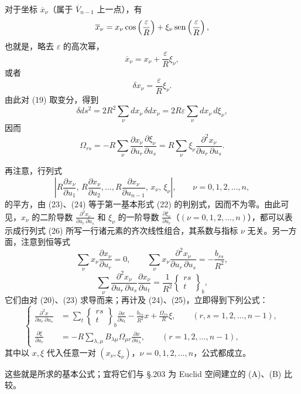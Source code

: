 对于坐标 $\overline{x}_\nu$（属于 $\overline{V}_{n-1}$ 上一点），有
\[
\overline{x}_\nu=x_\nu\cos\left(\frac\varepsilon R\right)+\xi_\nu\operatorname{sen}\left(\frac\varepsilon R\right),
\]
也就是，略去 $\varepsilon$ 的高次幂，
\[
\overline{x}_\nu=x_\nu+\frac{\varepsilon}{R}\xi_\nu,
\]
或者
\[
\delta x_\nu=\frac{\varepsilon}{R}\xi_\nu.
\]
由此对 (19) 取变分，得到
\[
\delta ds^2=2R^2\sum_\nu d x_\nu\,\delta d x_\nu
=2R\varepsilon\sum_\nu dx_\nu\,d\xi_\nu,
\]
因而
\[
\tag{25}
\Omega_{rs}=-R\sum_\nu
\frac{\partial x_\nu}{\partial u_r}\frac{\partial\xi_\nu}{\partial u_s}
=R\sum_\nu\xi_\nu\frac{\partial^2x_\nu}{\partial u_r\,\partial u_s}.
\]

再注意，行列式
\[
\tag{26}
\left|R\frac{\partial x_\nu}{\partial u_1},\,
R\frac{\partial x_\nu}{\partial u_2},\ldots,
R\frac{\partial x_\nu}{\partial u_{n-1}},\,x_\nu,\,\xi_\nu\right|,
\qquad \nu=0,1,2,\ldots,n,
\]
的平方，由 (23)、(24) 等于第一基本形式 (22) 的判别式，因而不为零。由此可见，$x_\nu$ 的二阶导数 $\frac{\partial^2x_\nu}{\partial u_r\,\partial u_s}$ 和 $\xi_\nu$ 的一阶导数 $\frac{\partial\xi_\nu}{\partial u_r}$（$(\nu=0,1,2,\ldots,n)$），都可以表示成行列式 (26) 所写一行诸元素的齐次线性组合，其系数与指标 $\nu$ 无关。另一方面，注意到恒等式
\[
\sum_\nu x_\nu\frac{\partial x_\nu}{\partial u_r}=0,\qquad
\sum_\nu x_\nu\frac{\partial^2x_\nu}{\partial u_r\,\partial u_s}
=-\frac{b_{rs}}{R^2},
\]
\[
\sum_\nu
\frac{\partial^2x_\nu}{\partial u_r\,\partial u_s}
\frac{\partial x_\nu}{\partial u_t}
=\frac1{R^2}\left\{\begin{matrix}rs\\ t\end{matrix}\right\}_b,
\]
它们由对 (20)、(23) 求导而来；再计及 (24)、(25)，立即得到下列公式：
\[
\tag{E}
\left\{
\begin{aligned}
\frac{\partial^2x}{\partial u_r\,\partial u_s}
&=\sum_t\left\{\begin{matrix}rs\\ t\end{matrix}\right\}_b
\frac{\partial x}{\partial u_t}
-\frac{b_{rs}}{R^2}x+\frac{\Omega_{rs}}{R}\xi,
\qquad (r,s=1,2,\ldots,n-1),\\
\frac{\partial\xi}{\partial u_r}
&=-R\sum_{\lambda,\mu}B_{\lambda\mu}\Omega_{\mu r}
\frac{\partial x}{\partial u_\lambda},
\qquad (r=1,2,\ldots,n-1),
\end{aligned}\right.
\]
其中以 $x,\xi$ 代入任意一对 $(x_\nu,\xi_\nu)$，$\nu=0,1,2,\ldots,n$，公式都成立。

这些就是所求的基本公式；宜将它们与 \S.203 为 Euclid 空间建立的 (A)、(B) 比较。

